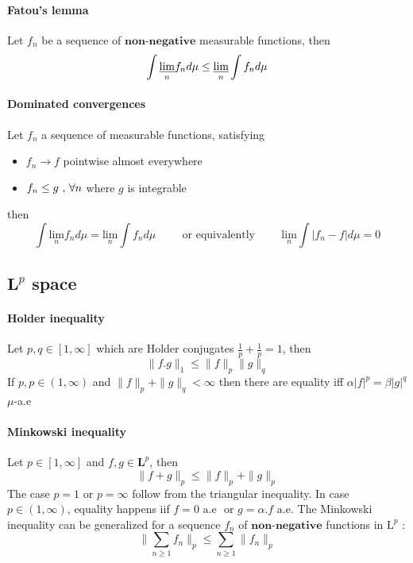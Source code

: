 \documentclass[a4paper,10pt]{article}
\begin{document}
\paragraph{Fatou's lemma}
Let $f_n$ be a sequence of $\textbf{non-negative}$ measurable functions, then
\[
\int \underset{n}{\varliminf} f_n d\mu \leq \underset{n}{\varliminf} \int  f_n d\mu 
\]

\paragraph{Dominated convergences}
Let $f_n$ a sequence of measurable functions, satisfying 
\begin{itemize}
 \item $f_n \longrightarrow f $ pointwise almost everywhere
 \item $f_n \leq g \hbox{ , } \forall n$ where $g$ is integrable 
\end{itemize}
then
\[
\int \underset{n}{\text{lim}} f_n d\mu = \underset{n}{\text{lim}} \int  f_n d\mu 
\hspace{1cm}
\text{or equivalently}
\hspace{1cm}
 \underset{n}{\text{lim}} \int |f_n -f| d\mu =0
\]

\subsection{\texorpdfstring{$\textbf{L}^p$}{LpSpace} space}
\paragraph{Holder inequality} Let $p,q \in [1,\infty]$ which are Holder conjugates $\frac{1}{p} + \frac{1}{p} = 1$, then
\[
\| f.g \|_{1} \leq \| f \|_{p}  \| g \|_{q}  
\]
If $p,p \in (1,\infty)$ and $ \| f \|_{p} + \| g \|_{q} <  \infty$ then there are equality iff $\alpha |f|^p = \beta |g|^q$ $\mu$-a.e

\paragraph{Minkowski inequality} Let $p \in [1,\infty]$ and $f,g \in \textbf{L}^p$, then
\[
\| f+g \|_p \leq \| f \|_p  + \| g \|_p 
\]
The case $p=1 \text{ or } p=\infty $ follow from the triangular inequality. In case  $p \in (1,\infty)$, equality happens iif $f=0 \text{ a.e }$ or $ g= \alpha.f \text{ a.e}$. The Minkowski inequality can be generalized for a sequence $f_{n}$ of $\textbf{non-negative}$ functions in $\text{L}^p$ :
\[
\| \sum_{n \geq 1} f_n \|_p \leq  \sum_{n \geq 1} \| f_n \|_p
\]
\end{document}
